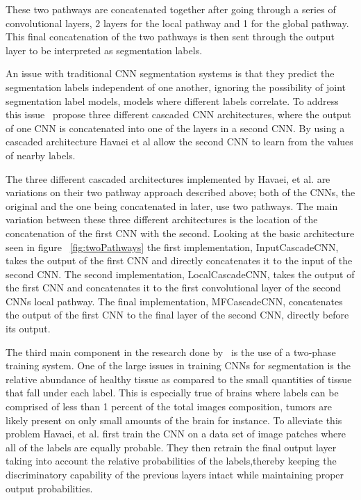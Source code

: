 \documentclass{sig-alternate}
\begin{document}
These two pathways are concatenated together after going through a series of convolutional layers, 2 layers for the local pathway and 1 for the global pathway. This final concatenation of the two pathways is then sent through the output layer to be interpreted as segmentation labels.

An issue with traditional CNN segmentation systems is that they predict the segmentation labels independent of one another, ignoring the possibility of joint segmentation label models, models where different labels correlate. To address this issue~\cite{Havaei:2017} propose three different cascaded CNN architectures, where the output of one CNN is concatenated into one of the layers in a second CNN. By using a cascaded architecture Havaei et al allow the second CNN to learn from the values of nearby labels.

\begin{figure*}
\centering
{}
\caption{The base two-pathway architedcture used by Havaei, et al. ~\cite{Havaei:2017}}
\label{fig:twoPathways}
\end{figure*}

The three different cascaded architectures implemented by Havaei, et al. are variations on their two pathway approach described above; both of the CNNs, the original and the one being concatenated in later, use two pathways. The main variation between these three different architectures is the location of the concatenation of the first CNN with the second. Looking at the basic architecture seen in figure ~\ref{fig:twoPathways} the first implementation, InputCascadeCNN, takes the output of the first CNN and directly concatenates it to the input of the second CNN. The second implementation, LocalCascadeCNN, takes the output of the first CNN and concatenates it to the first convolutional layer of the second CNNs local pathway. The final implementation, MFCascadeCNN, concatenates the output of the first CNN to the final layer of the second CNN, directly before its output.

The third main component in the research done by~\cite{Havaei:2017} is the use of a two-phase training system. One of the large issues in training CNNs for segmentation is the relative abundance of healthy tissue as compared to the small quantities of tissue that fall under each label. This is especially true of brains where labels can be comprised of less than 1 percent of the total images composition, tumors are likely present on only small amounts of the brain for instance. To alleviate this problem Havaei, et al. first train the CNN on a data set of image patches where all of the labels are equally probable. They then retrain the final output layer taking into account the relative probabilities of the labels,thereby keeping the discriminatory capability of the previous layers intact while maintaining proper output probabilities.
\end{document}
